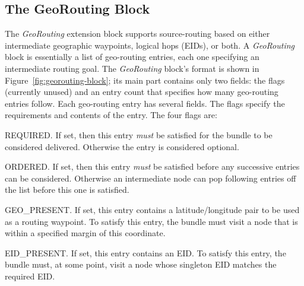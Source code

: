 \subsection{The GeoRouting Block}
\begin{sloppypar}
The {\em GeoRouting} extension block supports source-routing based on either intermediate geographic waypoints, logical hops (EIDs), or both.  A {\em GeoRouting} block is essentially a list of geo-routing entries, each one specifying an intermediate routing goal. The {\em GeoRouting} block's format is shown in Figure~\ref{fig:georouting-block}; its main part contains only two fields: the flags (currently unused) and an entry count that specifies how many geo-routing entries follow.  Each geo-routing entry has several fields.  The flags specify the requirements and contents of the entry. The four flags are:
\begin{description*}
  \item[REQUIRED.] If set, then this entry {\it must} be satisfied for the bundle to be considered delivered.  Otherwise the entry is considered optional.
  \item[ORDERED.] If set, then this entry {\it must} be satisfied before any successive entries can be considered.  Otherwise an intermediate node can pop following entries off the list before this one is satisfied.
  \item[GEO\_PRESENT.] If set, this entry contains a latitude/longitude pair to be used as a routing waypoint.  To satisfy this entry, the bundle must visit a node that is within a specified margin of this coordinate.
  \item[EID\_PRESENT.] If set, this entry contains an EID.  To satisfy this entry, the bundle must, at some point, visit a node whose singleton EID matches the required EID.
\end{description*}
\end{sloppypar}

